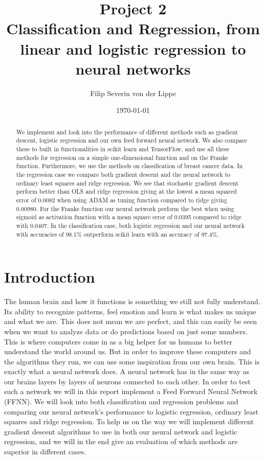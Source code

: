 \documentclass[11pt]{article}
\title{Project 2\\ Classification and Regression, from linear and logistic regression to neural networks}
\author{Filip Severin von der Lippe}
\date{\today}
\begin{document}
\maketitle
\begin{abstract}
  We implement and look into the performance of different methods such as gradient descent, logistic regression and our own feed forward neural network. We also compare these to built in functionalities in scikit learn and TensorFlow, and use all these methods for regression on a simple one-dimensional function and on the Franke function. Furthermore, we use the methods on classification of breast cancer data. In the regression case we compare both gradient descent and the neural network to ordinary least squares and ridge regression. We see that stochastic gradient descent perform better than OLS and ridge regression giving at the lowest a mean squared error of $0.0082$ when using ADAM as tuning function compared to ridge giving 0.00980. For the Franke function our neural network perform the best when using sigmoid as activation function with a mean square error of 0.0395 compared to ridge with 0.0407. In the classification case, both logistic regression and our neural network with accuracies of 98.1\% outperform scikit learn with an accuracy of 97.4\%.
\end{abstract}
\newpage
\tableofcontents
\newpage
\section{Introduction}
The human brain and how it functions is something we still not fully understand. Its ability to recognize patterns, feel emotion and learn is what makes us unique and what we are. This does not mean we are perfect, and this can easily be seen when we want to analyze data or do predictions based on just some numbers. This is where computers come in as a big helper for us humans to better understand the world around us. But in order to improve these computers and the algorithms they run, we can use some inspiration from our own brain. This is exactly what a neural network does. A neural network has in the same way as our brains layers by layers of neurons connected to each other. In order to test such a network we will in this report implement a Feed Forward Neural Network (FFNN). We will look into both classification and regression problems and comparing our neural network's performance to logistic regression, ordinary least squares and ridge regression. To help us on the way we will implement different gradient descent algorithms to use in both our neural network and logistic regression, and we will in the end give an evaluation of which methods are superior in different cases.
\end{document}
